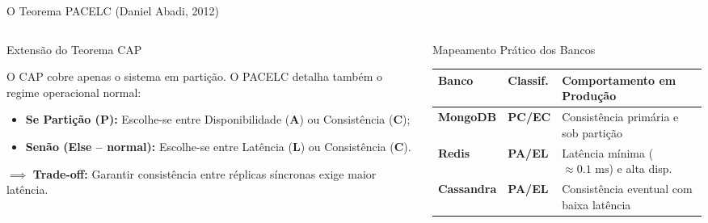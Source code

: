 \begin{frame}{O Teorema PACELC (Daniel Abadi, 2012)}
  \vspace{0.1cm}
  \begin{columns}[t,onlytextwidth]
    \begin{column}{0.41\textwidth}
      \alert{Extensão do Teorema CAP}\par
      \footnotesize
      O CAP cobre apenas o sistema em partição. O PACELC detalha também o regime operacional normal:
      \begin{itemize}
        \item \textbf{Se Partição (\textbf{P}):} Escolhe-se entre Disponibilidade (\textbf{A}) ou Consistência (\textbf{C});
        \item \textbf{Senão (\textbf{E}lse -- normal):} Escolhe-se entre Latência (\textbf{L}) ou Consistência (\textbf{C}).
      \end{itemize}
      
      \vspace{0.1cm}
      $\implies$ \textbf{Trade-off:} Garantir consistência entre réplicas síncronas exige maior latência.
    \end{column}
    
    \begin{column}{0.56\textwidth}
      \alert{Mapeamento Prático dos Bancos}\par
      \vspace{0.4cm}
      \scriptsize
      \begin{tabular}{@{}llp{3.8cm}@{}}
        \toprule
        \textbf{Banco} & \textbf{Classif.} & \textbf{Comportamento em Produção} \\
        \midrule
        \textbf{MongoDB}   & \textbf{PC/EC} & Consistência primária e sob partição \\
        \textbf{Redis}     & \textbf{PA/EL} & Latência mínima ($\approx 0.1\text{ ms}$) e alta disp. \\
        \textbf{Cassandra} & \textbf{PA/EL} & Consistência eventual com baixa latência \\
        \bottomrule
      \end{tabular}
    \end{column}
  \end{columns}
\end{frame}


